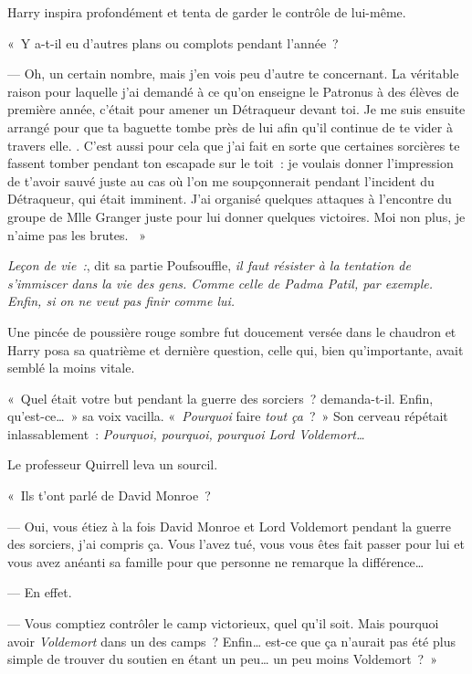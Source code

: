 Harry inspira profondément et tenta de garder le contrôle de lui-même.

«~Y a-t-il eu d'autres plans ou complots pendant l'année~?

--- Oh, un certain nombre, mais j'en vois peu d'autre te concernant. La véritable raison pour laquelle j'ai demandé à ce qu'on enseigne le Patronus à des élèves de première année, c'était pour amener un Détraqueur devant toi. Je me suis ensuite arrangé pour que ta baguette tombe près de lui afin qu'il continue de te vider à travers elle. . C'est aussi pour cela que j'ai fait en sorte que certaines sorcières te fassent tomber pendant ton escapade sur le toit~: je voulais donner l'impression de t'avoir sauvé juste au cas où l'on me soupçonnerait pendant l'incident du Détraqueur, qui était imminent.  J'ai organisé quelques attaques à l'encontre du groupe de Mlle Granger juste pour lui donner quelques victoires. Moi non plus, je n'aime pas les brutes. ~»

\emph{Leçon de vie~:}, dit sa partie Poufsouffle, \emph{il faut résister à la tentation de s'immiscer dans la vie des gens. Comme celle de Padma Patil, par exemple. Enfin, si on ne veut pas finir comme lui.}

Une pincée de poussière rouge sombre fut doucement versée dans le chaudron et Harry posa sa quatrième et dernière question, celle qui, bien qu'importante, avait semblé la moins vitale.

«~Quel était votre but pendant la guerre des sorciers~? demanda-t-il. Enfin, qu'est-ce…~» sa voix vacilla. «~\emph{Pourquoi} faire \emph{tout ça}~?~» Son cerveau répétait inlassablement~: \emph{Pourquoi, pourquoi, pourquoi Lord Voldemort…}

Le professeur Quirrell leva un sourcil.

«~Ils t'ont parlé de David Monroe~?

--- Oui, vous étiez à la fois David Monroe et Lord Voldemort pendant la guerre des sorciers, j'ai compris ça. Vous l'avez tué, vous vous êtes fait passer pour lui et vous avez anéanti sa famille pour que personne ne remarque la différence…

--- En effet.

--- Vous comptiez contrôler le camp victorieux, quel qu'il soit. Mais pourquoi avoir \emph{Voldemort} dans un des camps~? Enfin… est-ce que ça n'aurait pas été plus simple de trouver du soutien en étant un peu… un peu moins Voldemort~?~»

